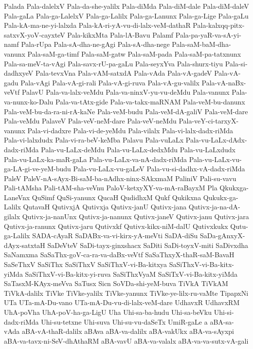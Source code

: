 {Palada
Pala-dalelxV
Pala-da-she-yalilx
Pala-diMda
Pala-diM-dale
Pala-diM-daleV
Pala-gaLa
Pala-ga-LalelxV
Pala-ga-Lalilx
Pala-ga-Lanunx
Pala-ga-Lige
Pala-gaLu
Pala-kA-ma-ne-yi-lalxda
Pala-kA-ri-yA-vu-di-lalx-veM-dathaR
Pala-kalxqq-pitx-satxvX-yoV-cayxteV
Pala-kikxMta
Pala-lA-Bavu
Palamf
Pala-pa-yaR-va-sA-yi-namf
Pala-rUpa
Pala-sA-dha-ne-gAgi
Pala-sA-dha-nege
Pala-saM-baM-dha-vanunx
Pala-saM-ga-timf
Pala-saM-gatw
Pala-saM-pada
Pala-saM-pa-tatxnunx
Pala-sa-meV-ta-vAgi
Pala-savx-rU-pa-gaLu
Pala-seyxYva
Pala-shurx-tiyu
Pala-si-dadhxyeV
Pala-tevxVna
Pala-vAM-satxdA
Pala-vAda
Pala-vA-gadeV
Pala-vA-gadu
Pala-vAgi
Pala-vA-gi-rali
Pala-vA-gi-ruva
Pala-vA-gu-valilx
Pala-vA-naBx-veVtf
PalavU
Pala-va-lalx-veMdu
Pala-va-ninxV-yu-vu-deMdu
Pala-vanunx
Pala-va-nunx-ko-Dalu
Pala-va-tAtx-gide
Pala-va-takx-maRNAM
Pala-veM-bu-danunx
Pala-veM-bu-da-ra-ni-rA-kaNe
Pala-veM-budu
Pala-veM-dA-galiV
Pala-veM-dare
Pala-veMdu
PalaveV
Pala-veV-neM-dare
Pala-veV-neMdu
Pala-veY-ci-tarxyX-vanunx
Pala-vi-dadxre
Pala-vi-de-yeMdu
Pala-vilalx
Pala-vi-lalx-dadx-riMda
Pala-vi-lalxdudx
Pala-vi-ra-beV-keMba
Palavu
Pala-vuLaLx
Pala-vu-LaLx-dAdx-dadx-riMda
Pala-vu-LaLx-deMdu
Pala-vu-LaLx-dedxMdu
Pala-vu-LaLxdudx
Pala-vu-LaLx-ka-maR-gaLa
Pala-vu-LaLx-va-nA-dadx-riMda
Pala-vu-LaLx-vu-ga-LA-gi-ve-yeM-budu
Pala-vu-LaLx-vu-gaLeV
Pala-vu-si-dadhx-vA-dadx-riMda
PaleV
PaleV-nA-sAyx-Bi-saM-ba-nAdhx-ninx-SAkxmaM
PaliniV
Pali-su-vavu
Pali-tAMsha
Pali-tAM-sha-veVnu
PaloV-ketxyXY-va-mA-raBayxM
Pla
Qkukxga-LaneVnx
QuSimf
QuSi-yanunx
QucaH
QudidhxM
Qukf
Qukikxna
Qukukx-ga-Lalilx
QutavaH
QutivxjA
Qutivxja
Qutivx-janU
Qutivx-jana
Qutivx-ja-na-dA-gilalx
Qutivx-ja-nanUnx
Qutivx-ja-nanunx
Qutivx-janeV
Qutivx-janu
Qutivx-jara
Qutivx-ja-ranunx
Qutivx-jaru
Qutivxkf
Qutivx-kikx-niM-dalU
Qutivxkukx
Qutu-ga-Lalilx
SADA-cAyaR
SaDABx-va-vi-kirx-yA-meVti
SaDA-diSu
SaDa-gAnxyX-dAyx-satxtaH
SaDeVteV
SaDi-tayx-ginxshacx
SaDiti
SaDi-toyxV-miti
SaDivxdha
SaNamxma
SaSaThx-goV-ca-ra-va-daBx-veVtf
SaSaThxyX-thaR-saM-BavaH
SaSeThxV
SaSiThx
SaSiThxV
SaSiThxV-vi-Ba-kitxya
SaSiThxV-vi-Ba-kitx-yiMda
SaSiThxV-vi-Ba-kitx-yi-ruva
SaSiThxVyaM
SaSiTxV-vi-Ba-kitx-yiMda
SaTasxM-KAyx-meVva
SaTusx
Sicn
SoVDa-shi-yeM-buva
TiVkA
TiVkAM
TiVkA-dalilx
TiVke
TiVke-yalilx
TiVke-yanunx
TiVke-ye-lilx-ru-vaMte
TipapxNi
UTa
UTa-mA-Du-vano
UTa-mA-Du-vu-di-lalx-veM-dare
UdhavxR
UdhavxRM
UhA-poVha
UhA-poV-ha-ga-LigU
Uha
Uhi-sa-ba-hudu
Uhi-sa-beVku
Uhi-si-dadx-riMda
Uhi-su-tetxne
Uhi-suva
Uhi-su-vu-daSeTx
UmiR-gaLe
a
aBA-sa-vAda
aBA-vA-thaR-dalilx
aBAva
aBA-va-dalilx
aBA-vakUkx
aBA-va-sAyxpi
aBA-va-tavx-ni-SeV-dhAthaRM
aBA-vavU
aBA-va-valalx
aBA-va-va-sutx-vA-gali
}
